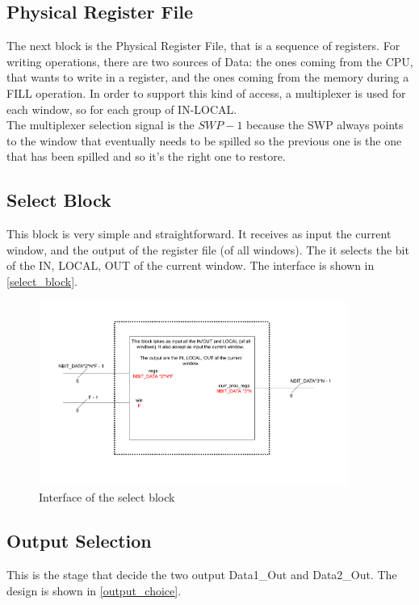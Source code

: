 \newpage

\subsection{Physical Register File}

The next block is the Physical Register File, that is a sequence of registers. For writing operations, there are two sources of Data: the ones coming from the CPU, that wants to write in a register, and the ones coming from the memory during a FILL operation. In order to support this kind of access, a multiplexer is used for each window, so for each group of IN-LOCAL.\\

The multiplexer selection signal is the $SWP-1$ because the SWP always points to the window that eventually needs to be spilled so the previous one is the one that has been spilled and so it's the right one to restore.

\subsection{Select Block}

This block is very simple and straightforward. It receives as input the current window, and the output of the register file (of all windows). The it selects the bit of the IN, LOCAL, OUT of the current window. The interface is shown in \autoref{select_block}.

\begin{figure}[ht]
  \centering
  \includegraphics[width=0.9\textwidth]{chapters/4_DecodeStage/images/select_block.pdf}
  \caption{Interface of the select block}
  \label{select_block}
\end{figure}

\subsection{Output Selection}
This is the stage that decide the two output Data1\_Out and Data2\_Out. The design is shown in \autoref{output_choice}.

